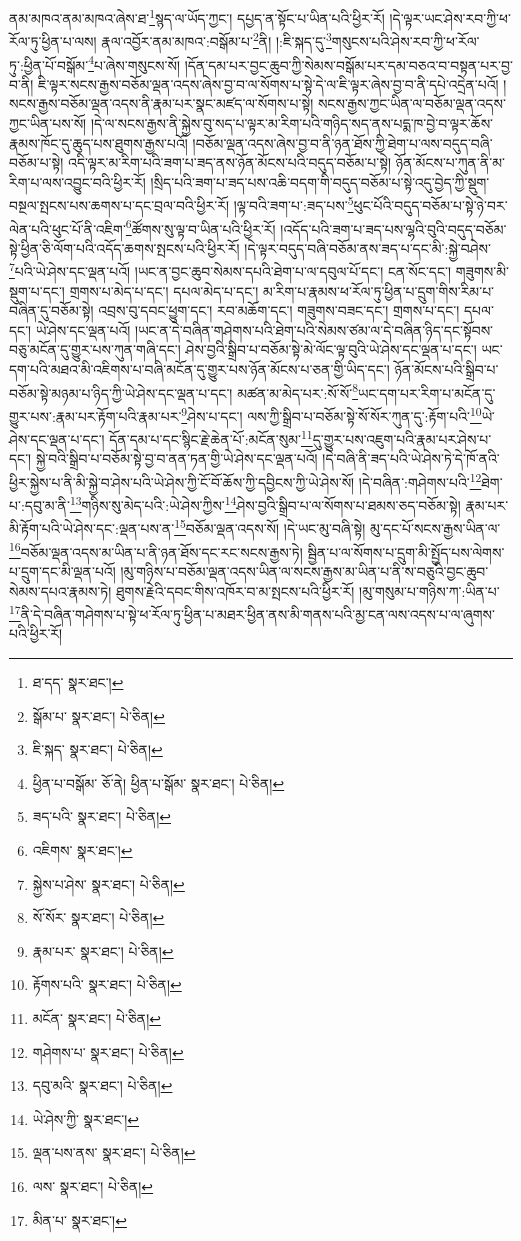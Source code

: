 ནམ་མཁའ་ནམ་མཁའ་ཞེས་ཐ་\footnote{ཐ་དད་  སྣར་ཐང་། }སྙད་ལ་ཡོད་ཀྱང་། དཔྱད་ན་སྟོང་པ་ཡིན་པའི་ཕྱིར་རོ། །དེ་ལྟར་ཡང་ཤེས་རབ་ཀྱི་ཕ་རོལ་ཏུ་ཕྱིན་པ་ལས། རྣལ་འབྱོར་ནམ་མཁའ་:བསྒོམ་པ་\footnote{སྒོམ་པ་  སྣར་ཐང་།  པེ་ཅིན། }ནི། །:ཇི་སྐད་དུ་\footnote{ཇི་སྐད་  སྣར་ཐང་།  པེ་ཅིན། }གསུངས་པའི་ཤེས་རབ་ཀྱི་ཕ་རོལ་ཏུ་:ཕྱིན་པོ་བསྒོམ་\footnote{ཕྱིན་པ་བསྒོམ་  ཅོ་ནེ། ཕྱིན་པ་སྒོམ་  སྣར་ཐང་།  པེ་ཅིན། }པ་ཞེས་གསུངས་སོ། །དོན་དམ་པར་བྱང་ཆུབ་ཀྱི་སེམས་བསྒོམ་པར་དམ་བཅའ་བ་བསྟན་པར་བྱ་བ་ནི། ཇི་ལྟར་སངས་རྒྱས་བཅོམ་ལྡན་འདས་ཞེས་བྱ་བ་ལ་སོགས་པ་སྟེ་དེ་ལ་ཇི་ལྟར་ཞེས་བྱ་བ་ནི་དཔེ་འདྲེན་པའོ། །སངས་རྒྱས་བཅོམ་ལྡན་འདས་ནི་རྣམ་པར་སྣང་མཛད་ལ་སོགས་པ་སྟེ། སངས་རྒྱས་ཀྱང་ཡིན་ལ་བཅོམ་ལྡན་འདས་ཀྱང་ཡིན་པས་སོ། །དེ་ལ་སངས་རྒྱས་ནི་སྐྱེས་བུ་སད་པ་ལྟར་མ་རིག་པའི་གཉིད་སད་ནས་པདྨ་ཁ་བྱེ་བ་ལྟར་ཆོས་རྣམས་ཁོང་དུ་ཆུད་པས་ཐུགས་རྒྱས་པའོ། །བཅོམ་ལྡན་འདས་ཞེས་བྱ་བ་ནི་ཉན་ཐོས་ཀྱི་ཐེག་པ་ལས་བདུད་བཞི་བཅོམ་པ་སྟེ། འདི་ལྟར་མ་རིག་པའི་ཟག་པ་ཟད་ནས་ཉོན་མོངས་པའི་བདུད་བཅོམ་པ་སྟེ། ཉོན་མོངས་པ་ཀུན་ནི་མ་རིག་པ་ལས་འབྱུང་བའི་ཕྱིར་རོ། །སྲིད་པའི་ཟག་པ་ཟད་པས་འཆི་བདག་གི་བདུད་བཅོམ་པ་སྟེ་འདུ་བྱེད་ཀྱི་སྡུག་བསྔལ་སྤངས་པས་ཆགས་པ་དང་བྲལ་བའི་ཕྱིར་རོ། །ལྟ་བའི་ཟག་པ་:ཟད་པས་\footnote{ཟད་པའི་  སྣར་ཐང་།  པེ་ཅིན། }ཕུང་པོའི་བདུད་བཅོམ་པ་སྟེ་ཉེ་བར་ལེན་པའི་ཕུང་པོ་ནི་འཇིག་\footnote{འཇིགས་  སྣར་ཐང་། }ཚོགས་སུ་ལྟ་བ་ཡིན་པའི་ཕྱིར་རོ། །འདོད་པའི་ཟག་པ་ཟད་པས་ལྷའི་བུའི་བདུད་བཅོམ་སྟེ་ཕྱིན་ཅི་ལོག་པའི་འདོད་ཆགས་སྤངས་པའི་ཕྱིར་རོ། །དེ་ལྟར་བདུད་བཞི་བཅོམ་ནས་ཟད་པ་དང་མི་:སྐྱེ་བཤེས་\footnote{སྐྱེས་པ་ཤེས་  སྣར་ཐང་།  པེ་ཅིན། }པའི་ཡེ་ཤེས་དང་ལྡན་པའོ། །ཡང་ན་བྱང་ཆུབ་སེམས་དཔའི་ཐེག་པ་ལ་དབུལ་པོ་དང་། ངན་སོང་དང་། གཟུགས་མི་སྡུག་པ་དང་། གྲགས་པ་མེད་པ་དང་། དཔལ་མེད་པ་དང་། མ་རིག་པ་རྣམས་ཕ་རོལ་ཏུ་ཕྱིན་པ་དྲུག་གིས་རིམ་པ་བཞིན་དུ་བཅོམ་སྟེ། འབྲས་བུ་དབང་ཕྱུག་དང་། རབ་མཆོག་དང་། གཟུགས་བཟང་དང་། གྲགས་པ་དང་། དཔལ་དང་། ཡེ་ཤེས་དང་ལྡན་པའོ། །ཡང་ན་དེ་བཞིན་གཤེགས་པའི་ཐེག་པའི་སེམས་ཙམ་ལ་དེ་བཞིན་ཉིད་དང་སྟོབས་བཅུ་མངོན་དུ་གྱུར་པས་ཀུན་གཞི་དང་། ཤེས་བྱའི་སྒྲིབ་པ་བཅོམ་སྟེ་མེ་ལོང་ལྟ་བུའི་ཡེ་ཤེས་དང་ལྡན་པ་དང་། ཡང་དག་པའི་མཐའ་མི་འཇིགས་པ་བཞི་མངོན་དུ་གྱུར་པས་ཉོན་མོངས་པ་ཅན་གྱི་ཡིད་དང་། ཉོན་མོངས་པའི་སྒྲིབ་པ་བཅོམ་སྟེ་མཉམ་པ་ཉིད་ཀྱི་ཡེ་ཤེས་དང་ལྡན་པ་དང་། མཚན་མ་མེད་པར་:སོ་སོ་\footnote{སོ་སོར་  སྣར་ཐང་།  པེ་ཅིན། }ཡང་དག་པར་རིག་པ་མངོན་དུ་གྱུར་པས་:རྣམ་པར་རྟོག་པའི་རྣམ་པར་\footnote{རྣམ་པར་  སྣར་ཐང་།  པེ་ཅིན། }ཤེས་པ་དང་། ལས་ཀྱི་སྒྲིབ་པ་བཅོམ་སྟེ་སོ་སོར་ཀུན་དུ་:རྟོག་པའི་\footnote{རྟོགས་པའི་  སྣར་ཐང་།  པེ་ཅིན། }ཡེ་ཤེས་དང་ལྡན་པ་དང་། དོན་དམ་པ་དང་སྙིང་རྗེ་ཆེན་པོ་:མངོན་སུམ་\footnote{མངོན་  སྣར་ཐང་།  པེ་ཅིན། }དུ་གྱུར་པས་འཇུག་པའི་རྣམ་པར་ཤེས་པ་དང་། སྐྱེ་བའི་སྒྲིབ་པ་བཅོམ་སྟེ་བྱ་བ་ནན་ཏན་གྱི་ཡེ་ཤེས་དང་ལྡན་པའོ། །དེ་བཞི་ནི་ཟད་པའི་ཡེ་ཤེས་ཏེ་དེ་ཁོ་ནའི་ཕྱིར་སྐྱེས་པ་ནི་མི་སྐྱེ་བ་ཤེས་པའི་ཡེ་ཤེས་ཀྱི་ངོ་བོ་ཆོས་ཀྱི་དབྱིངས་ཀྱི་ཡེ་ཤེས་སོ། །དེ་བཞིན་:གཤེགས་པའི་\footnote{གཤེགས་པ་  སྣར་ཐང་།  པེ་ཅིན། }ཐེག་པ་:དབུ་མ་ནི་\footnote{དབུ་མའི་  སྣར་ཐང་།  པེ་ཅིན། }གཉིས་སུ་མེད་པའི་:ཡེ་ཤེས་ཀྱིས་\footnote{ཡེ་ཤེས་ཀྱི་  སྣར་ཐང་། }ཤེས་བྱའི་སྒྲིབ་པ་ལ་སོགས་པ་ཐམས་ཅད་བཅོམ་སྟེ། རྣམ་པར་མི་རྟོག་པའི་ཡེ་ཤེས་དང་:ལྡན་པས་ན་\footnote{ལྡན་པས་ནས་  སྣར་ཐང་།  པེ་ཅིན། }བཅོམ་ལྡན་འདས་སོ། །དེ་ཡང་མུ་བཞི་སྟེ། མུ་དང་པོ་སངས་རྒྱས་ཡིན་ལ་\footnote{ལས་  སྣར་ཐང་།  པེ་ཅིན། }བཅོམ་ལྡན་འདས་མ་ཡིན་པ་ནི་ཉན་ཐོས་དང་རང་སངས་རྒྱས་ཏེ། སྦྱིན་པ་ལ་སོགས་པ་དྲུག་མི་སྤྱོད་པས་ལེགས་པ་དྲུག་དང་མི་ལྡན་པའོ། །མུ་གཉིས་པ་བཅོམ་ལྡན་འདས་ཡིན་ལ་སངས་རྒྱས་མ་ཡིན་པ་ནི་ས་བཅུའི་བྱང་ཆུབ་སེམས་དཔའ་རྣམས་ཏེ། ཐུགས་རྗེའི་དབང་གིས་འཁོར་བ་མ་སྤངས་པའི་ཕྱིར་རོ། །མུ་གསུམ་པ་གཉིས་ཀ་:ཡིན་པ་\footnote{མིན་པ་  སྣར་ཐང་། }ནི་དེ་བཞིན་གཤེགས་པ་སྟེ་ཕ་རོལ་ཏུ་ཕྱིན་པ་མཐར་ཕྱིན་ནས་མི་གནས་པའི་མྱ་ངན་ལས་འདས་པ་ལ་ཞུགས་པའི་ཕྱིར་རོ། 